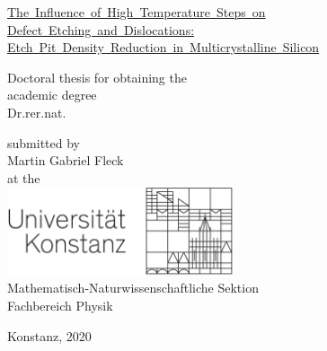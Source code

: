\documentclass[titlepage,a4paper]{article}
\newcommand{\tinyspace}{\nobreak\hspace{.16667em}} %
\begin{document}
\thispagestyle{empty}
\begin{center}
  \begin{sffamily}
    \begin{bfseries}
      \begin{LARGE}
	\vspace*{8mm}
	\mbox{\ul{The Influence of High Temperature Steps on}}\\%
	\mbox{\ul{Defect Etching and Dislocations:}}\\%
	\mbox{\ul{Etch Pit Density Reduction in Multicrystalline Silicon}}\\%
	\vspace{15mm}
      \end{LARGE}
      \begin{Large}
	\Large
	Doctoral thesis for obtaining the\\[0.6\baselineskip]
	academic degree\\[0.6\baselineskip]
	Dr.{\tinyspace}rer.{\tinyspace}nat.\\
      \end{Large}
    \end{bfseries}
    \begin{mdseries}
      \begin{large}
	\vspace{15mm}
	submitted by \\[0.6\baselineskip]
	Martin Gabriel Fleck\\
	\vspace{15mm}
	at the\\[\baselineskip]
	{\includegraphics[width=0.5\textwidth]{UniKonstanz_Logo_Optimum_SW}}\\
	\vspace{24mm}
	Mathematisch-Naturwissenschaftliche Sektion\\[0.6\baselineskip]
	Fachbereich Physik\\
      \end{large}
    \end{mdseries}
  \end{sffamily}
\end{center}
{
  \large\mdseries\sffamily
  \vspace{27mm}
  \hspace{-12mm} Konstanz, 2020
}
\end{document}
